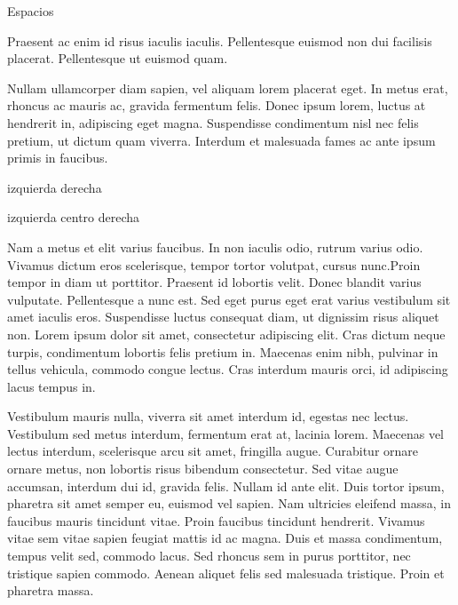 \documentclass[11pt,a4paper]{report}
\begin{document}
Espacios




Praesent ac enim id risus iaculis iaculis. Pellentesque euismod non dui facilisis placerat. Pellentesque ut euismod quam.

\vskip 5cm 


Nullam \hspace{2cm} ullamcorper \quad diam sapien, vel aliquam lorem placerat eget. In metus erat, rhoncus ac mauris ac, gravida fermentum felis. Donec ipsum lorem, luctus at hendrerit in, adipiscing eget magna. Suspendisse condimentum nisl nec felis pretium, ut dictum quam viverra. Interdum et malesuada fames ac ante ipsum primis in faucibus.

\bigskip
\noindent
izquierda \hfill derecha

\noindent
izquierda \hfill  centro \hfill derecha

\bigskip

Nam a metus et elit varius faucibus. In non iaculis odio, rutrum varius odio. Vivamus dictum eros scelerisque, tempor tortor volutpat, cursus nunc.Proin tempor in diam ut porttitor. Praesent id lobortis velit. Donec blandit varius vulputate. Pellentesque a nunc est. Sed eget purus eget erat varius vestibulum sit amet iaculis eros. Suspendisse luctus consequat diam, ut dignissim risus aliquet non. Lorem ipsum dolor sit amet, consectetur adipiscing elit. Cras dictum neque turpis, condimentum lobortis felis pretium in. Maecenas enim nibh, pulvinar in tellus vehicula, commodo congue lectus. Cras interdum mauris orci, id adipiscing lacus tempus in.

Vestibulum mauris nulla, viverra sit amet interdum id, egestas nec lectus. Vestibulum sed metus interdum, fermentum erat at, lacinia lorem. Maecenas vel lectus interdum, scelerisque arcu sit amet, fringilla augue. Curabitur ornare ornare metus, non lobortis risus bibendum consectetur. Sed vitae augue accumsan, interdum dui id, gravida felis. Nullam id ante elit. Duis tortor ipsum, pharetra sit amet semper eu, euismod vel sapien. Nam ultricies eleifend massa, in faucibus mauris tincidunt vitae. Proin faucibus tincidunt hendrerit. Vivamus vitae sem vitae sapien feugiat mattis id ac magna. Duis et massa condimentum, tempus velit sed, commodo lacus. Sed rhoncus sem in purus porttitor, nec tristique sapien commodo. Aenean aliquet felis sed malesuada tristique. Proin et pharetra massa.
\end{document}
